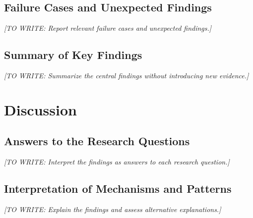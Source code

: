 \documentclass[12pt,a4paper,oneside]{report}
\newif\ifshowguidance
\newcommand{\Guide}[1]{%
  \ifshowguidance
  \begin{tcolorbox}[enhanced,breakable,colback=GuideBlue,
    colframe=GuideBorder,boxrule=0.5pt,arc=1mm,
    title={Writing guide --- replace with your research},
    colbacktitle=ThesisBlue,coltitle=white,fonttitle=\small\bfseries,
    before skip=10pt,after skip=10pt]
    \small #1
  \end{tcolorbox}
  \fi}
\newcommand{\Draft}[1]{\par\noindent\textit{[TO WRITE: #1]}\par}
\begin{document}
\section{Failure Cases and Unexpected Findings}
\Guide{Document cases where the method fails, findings conflict with
expectations, or evidence is inconclusive. Identify the conditions and
frequency when possible. Do not quietly remove difficult cases.}
\Draft{Report relevant failure cases and unexpected findings.}

\section{Summary of Key Findings}
\Guide{Summarize only findings established in this chapter. Organize them
by question or objective so that the discussion can interpret them directly.}
\Draft{Summarize the central findings without introducing new evidence.}

\chapter{Discussion}
\label{ch:discussion}
\Guide{Explain what the findings mean, why they may have occurred, how they
relate to prior work, and how far the conclusions extend. Make the chain
from evidence to interpretation explicit. Avoid repeating results verbatim.}

\section{Answers to the Research Questions}
\Guide{For each question, state the supported answer and cite the relevant
result sections. Distinguish supported, partially supported, unresolved,
and contradicted expectations. Explain uncertainty and alternative readings.}
\Draft{Interpret the findings as answers to each research question.}

\section{Interpretation of Mechanisms and Patterns}
\Guide{Connect observed patterns to theory or plausible mechanisms. Separate
demonstrated mechanisms from hypotheses. Consider competing explanations,
confounding, and measurement effects; correlation alone does not establish
causation.}
\Draft{Explain the findings and assess alternative explanations.}
\end{document}
